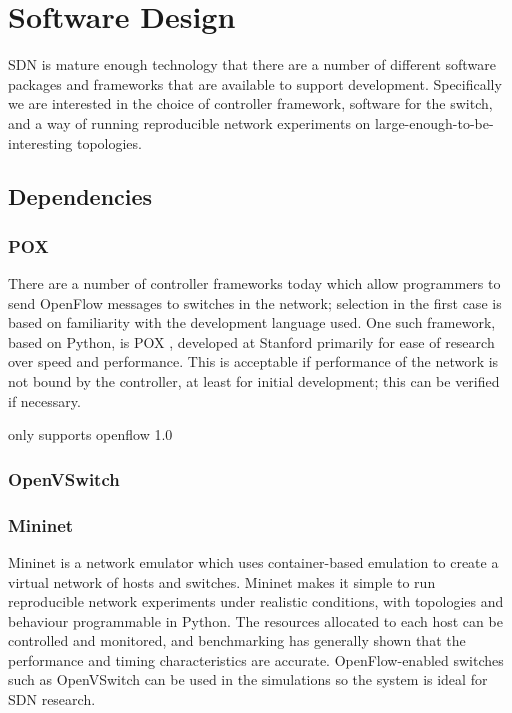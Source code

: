 \chapter{Software Design}

SDN is mature enough technology that there are a number of different software packages and frameworks that are available to support development. Specifically we are interested in the choice of controller framework, software for the switch, and a way of running reproducible network experiments on large-enough-to-be-interesting topologies.

\section{Dependencies}
\subsection{POX}
There are a number of controller frameworks today which allow programmers to send OpenFlow messages to switches in the network; selection in the first case is based on familiarity with the development language used. One such framework, based on Python, is POX \cite{onl:pox}, developed at Stanford primarily for ease of research over speed and performance. This is acceptable if performance of the network is not bound by the controller, at least for initial development; this can be verified if necessary.

only supports openflow 1.0

\subsection{OpenVSwitch}

\subsection{Mininet}
Mininet is a network emulator which uses container-based emulation \cite{handigol:mininet} to create a virtual network of hosts and switches. Mininet makes it simple to run reproducible network experiments under realistic conditions, with topologies and behaviour programmable in Python. The resources allocated to each host can be controlled and monitored, and benchmarking \cite{handigol:benchmarks} has generally shown that the performance and timing characteristics are accurate. OpenFlow-enabled switches such as OpenVSwitch can be used in the simulations so the system is ideal for SDN research.

